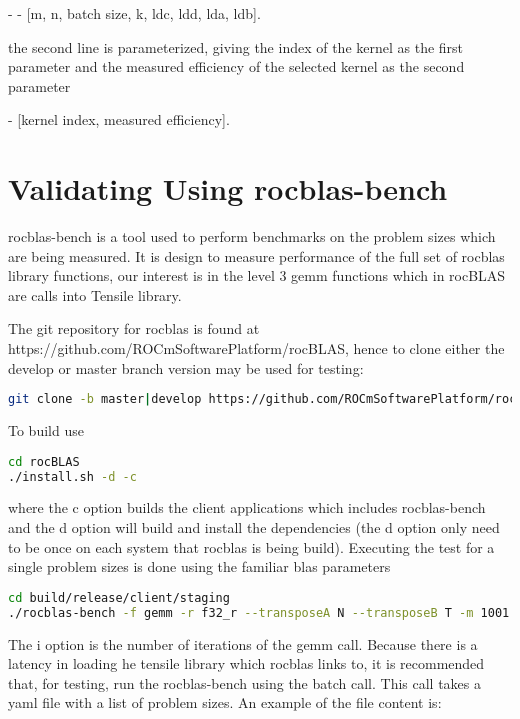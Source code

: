 \documentclass[]{article}
\begin{document}
\begin{center}
 	- - [m, n, batch size, k, ldc, ldd, lda, ldb]. 
\end{center} 

the second line is parameterized, giving the index of the kernel as the first parameter and the measured efficiency of the selected kernel as the second parameter

\begin{center}
	- [kernel index, measured efficiency].
\end{center}

\section{Validating Using rocblas-bench}

rocblas-bench is a tool used to perform benchmarks on the problem sizes which are being measured. It is design to measure performance of the full set of rocblas library functions, our interest is in the level 3 gemm functions which in rocBLAS are calls into Tensile library. 

The git repository for rocblas is found at https://github.com/ROCmSoftwarePlatform/rocBLAS, hence to clone either the develop or master branch version may be used for testing:

\begin{lstlisting}[language=bash]
git clone -b master|develop https://github.com/ROCmSoftwarePlatform/rocBLAS.git
\end{lstlisting}

To build use

\begin{lstlisting}[language=bash]
cd rocBLAS
./install.sh -d -c
\end{lstlisting}

where the c option builds the client applications which includes rocblas-bench and the d option will build and install the dependencies (the d option only need to be once on each system that rocblas is being build). Executing the test for a single problem sizes is done using the familiar blas parameters

\begin{lstlisting}[language=bash]
cd build/release/client/staging
./rocblas-bench -f gemm -r f32_r --transposeA N --transposeB T -m 1001 -n 1536 -k 64 --alpha 1.0 --lda 1001 --ldb 1536 --beta 0.0 --ldc 1001 -i 10 
\end{lstlisting} 

The i option is the number of iterations of the gemm call. Because there is a latency in loading he tensile library which rocblas links to, it is recommended that, for testing, run the rocblas-bench using the batch call. This call takes a yaml file with a list of problem sizes. An example of the file content is:
\end{document}
